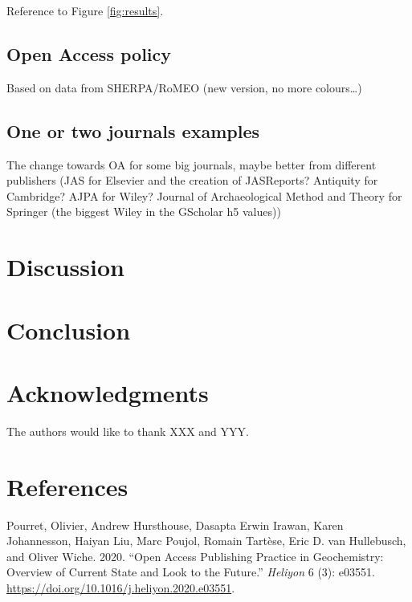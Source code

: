 \documentclass[fleqn,10pt,lineno]{wlpeerj} %
\newlength{\cslhangindent}
\newenvironment{cslreferences}%
  {\setlength{\parindent}{0pt}%
  \everypar{\setlength{\hangindent}{\cslhangindent}}\ignorespaces}%
  {\par}
\begin{document}
Reference to Figure \ref{fig:results}.

\hypertarget{open-access-policy}{%
\subsection*{Open Access policy}\label{open-access-policy}}

Based on data from SHERPA/RoMEO (new version, no more colours\ldots)

\hypertarget{one-or-two-journals-examples}{%
\subsection*{One or two journals examples}\label{one-or-two-journals-examples}}

The change towards OA for some big journals, maybe better from different publishers (JAS for Elsevier and the creation of JASReports? Antiquity for Cambridge? AJPA for Wiley? Journal of Archaeological Method and Theory
for Springer (the biggest Wiley in the GScholar h5 values))

\hypertarget{discussion}{%
\section*{Discussion}\label{discussion}}

\hypertarget{conclusion}{%
\section*{Conclusion}\label{conclusion}}

\hypertarget{acknowledgments}{%
\section*{Acknowledgments}\label{acknowledgments}}

The authors would like to thank XXX and YYY.

\hypertarget{references}{%
\section*{References}\label{references}}

\hypertarget{refs}{}
\begin{cslreferences}
\leavevmode\hypertarget{ref-pourret_open_2020}{}%
Pourret, Olivier, Andrew Hursthouse, Dasapta Erwin Irawan, Karen Johannesson, Haiyan Liu, Marc Poujol, Romain Tartèse, Eric D. van Hullebusch, and Oliver Wiche. 2020. ``Open Access Publishing Practice in Geochemistry: Overview of Current State and Look to the Future.'' \emph{Heliyon} 6 (3): e03551. \url{https://doi.org/10.1016/j.heliyon.2020.e03551}.
\end{cslreferences}
\end{document}

